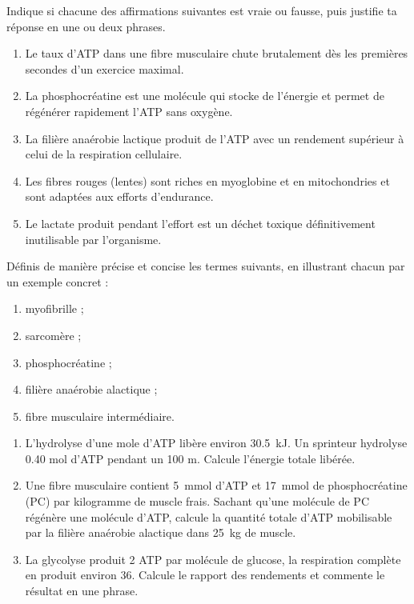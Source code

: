 \documentclass[11pt]{article}
\begin{document}
\begin{exercice}
Indique si chacune des affirmations suivantes est vraie ou fausse, puis justifie ta réponse en une ou deux phrases.
\begin{enumerate}
\item Le taux d'ATP dans une fibre musculaire chute brutalement dès les premières secondes d'un exercice maximal.
\item La phosphocréatine est une molécule qui stocke de l'énergie et permet de régénérer rapidement l'ATP sans oxygène.
\item La filière anaérobie lactique produit de l'ATP avec un rendement supérieur à celui de la respiration cellulaire.
\item Les fibres rouges (lentes) sont riches en myoglobine et en mitochondries et sont adaptées aux efforts d'endurance.
\item Le lactate produit pendant l'effort est un déchet toxique définitivement inutilisable par l'organisme.
\end{enumerate}
\end{exercice}

\begin{exercice}
Définis de manière précise et concise les termes suivants, en illustrant chacun par un exemple concret :
\begin{enumerate}
\item myofibrille ; \item sarcomère ; \item phosphocréatine ; \item filière anaérobie alactique ; \item fibre musculaire intermédiaire.
\end{enumerate}
\end{exercice}

\begin{exercice}
\begin{enumerate}
\item L'hydrolyse d'une mole d'ATP libère environ \SI{30,5}{kJ}. Un sprinteur hydrolyse \num{0,40} mol d'ATP pendant un 100 m. Calcule l'énergie totale libérée.
\item Une fibre musculaire contient \SI{5}{mmol} d'ATP et \SI{17}{mmol} de phosphocréatine (PC) par kilogramme de muscle frais. Sachant qu'une molécule de PC régénère une molécule d'ATP, calcule la quantité totale d'ATP mobilisable par la filière anaérobie alactique dans \SI{25}{kg} de muscle.
\item La glycolyse produit 2 ATP par molécule de glucose, la respiration complète en produit environ 36. Calcule le rapport des rendements et commente le résultat en une phrase.
\end{enumerate}
\end{exercice}
\end{document}

